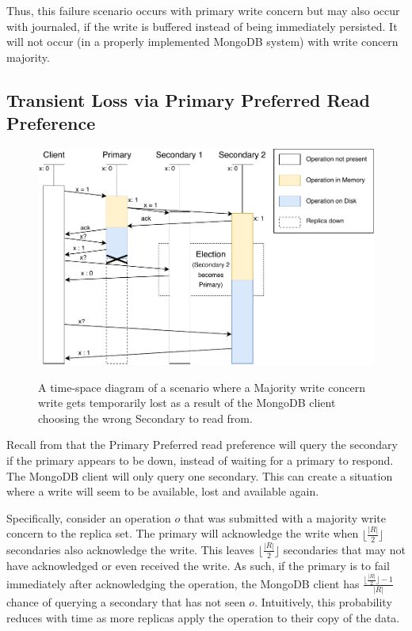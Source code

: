 Thus, this failure scenario occurs with primary write concern but may also occur with journaled, if the write is buffered instead of being immediately persisted. It will not occur (in a properly implemented MongoDB system) with write concern majority.

\pagebreak
\subsection{Transient Loss via Primary Preferred Read Preference}
\begin{figure}[H]
    \centering
    \includegraphics{images/PrimaryPreferred.pdf}
    \label{fig:primarypreferred}
    \caption{A time-space diagram of a scenario where a Majority write concern write gets temporarily lost as a result of the MongoDB client choosing the wrong Secondary to read from.}
\end{figure}

Recall from  that the Primary Preferred read preference will query the secondary if the primary appears to be down, instead of waiting for a primary to respond. The MongoDB client will only query one secondary. This can create a situation where a write will seem to be available, lost and available again. 

Specifically, consider an operation $o$ that was submitted with a majority write concern to the replica set. The primary will acknowledge the write when $\lfloor\frac{|R|}{2}\rfloor$ secondaries also acknowledge the write. This leaves $\lfloor\frac{|R|}{2}\rfloor$ secondaries that may not have acknowledged or even received the write. As such, if the primary is to fail immediately after acknowledging the operation, the MongoDB client has $\frac{\lfloor\frac{|R|}{2}\rfloor - 1}{|R|}$ chance of querying  a secondary that has not seen $o$. Intuitively, this probability reduces with time as more replicas apply the operation to their copy of the data.

